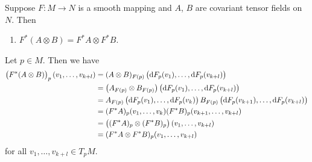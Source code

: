 \begin{exercise}
	Suppose $F: M \to N$ is a smooth mapping and $A$, $B$ are covariant tensor fields on $N$. Then
	\begin{enumerate}[label = (\alph*)]
		\item $F^*(A \otimes B) = F^*A \otimes F^* B$.
	\end{enumerate}
\end{exercise}

\begin{solution}
	Let $p \in M$. Then we have
	\begin{align*}
		\del[1]{F^*(A\otimes B)}_p (v_1,\dots,v_{k + l})&= (A \otimes B)_{F(p)}\del[1]{\d F_p(v_1), \dots, \d F_p(v_{k + l})}\\
		&= \del[1]{A_{F(p)} \otimes B_{F(p)}} \del[1]{\d F_p(v_1), \dots, \d F_p(v_{k + l})}\\
		&= A_{F(p)}\del[1]{\d F_p(v_1), \dots, \d F_p(v_{k})}B_{F(p)}\del[1]{\d F_p(v_{k+1}), \dots, \d F_p(v_{k + l})}\\
		&= (F^* A)_p(v_1,\dots,v_k) (F^* B)_p(v_{k+1},\dots,v_{k + l})\\
		&= \del[1]{(F^* A)_p \otimes (F^* B)_p}(v_1,\dots,v_{k + l})\\
		&= (F^* A \otimes F^* B)_p(v_1,\dots,v_{k + l})
	\end{align*}
	\noindent for all $v_1,\dots,v_{k + l} \in T_pM$.

\end{solution}
